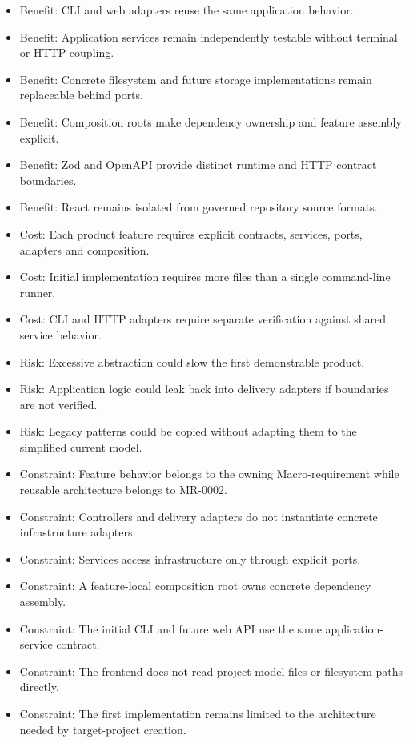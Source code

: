 \documentclass[
  10pt,
]{article}
\providecommand{\tightlist}{%
  \setlength{\itemsep}{0pt}\setlength{\parskip}{0pt}}
\begin{document}
\begin{itemize}
\tightlist
\item
  Benefit: CLI and web adapters reuse the same application behavior.
\item
  Benefit: Application services remain independently testable without
  terminal or HTTP coupling.
\item
  Benefit: Concrete filesystem and future storage implementations remain
  replaceable behind ports.
\item
  Benefit: Composition roots make dependency ownership and feature
  assembly explicit.
\item
  Benefit: Zod and OpenAPI provide distinct runtime and HTTP contract
  boundaries.
\item
  Benefit: React remains isolated from governed repository source
  formats.
\item
  Cost: Each product feature requires explicit contracts, services,
  ports, adapters and composition.
\item
  Cost: Initial implementation requires more files than a single
  command-line runner.
\item
  Cost: CLI and HTTP adapters require separate verification against
  shared service behavior.
\item
  Risk: Excessive abstraction could slow the first demonstrable product.
\item
  Risk: Application logic could leak back into delivery adapters if
  boundaries are not verified.
\item
  Risk: Legacy patterns could be copied without adapting them to the
  simplified current model.
\item
  Constraint: Feature behavior belongs to the owning Macro-requirement
  while reusable architecture belongs to MR-0002.
\item
  Constraint: Controllers and delivery adapters do not instantiate
  concrete infrastructure adapters.
\item
  Constraint: Services access infrastructure only through explicit
  ports.
\item
  Constraint: A feature-local composition root owns concrete dependency
  assembly.
\item
  Constraint: The initial CLI and future web API use the same
  application-service contract.
\item
  Constraint: The frontend does not read project-model files or
  filesystem paths directly.
\item
  Constraint: The first implementation remains limited to the
  architecture needed by target-project creation.
\end{itemize}
\end{document}
